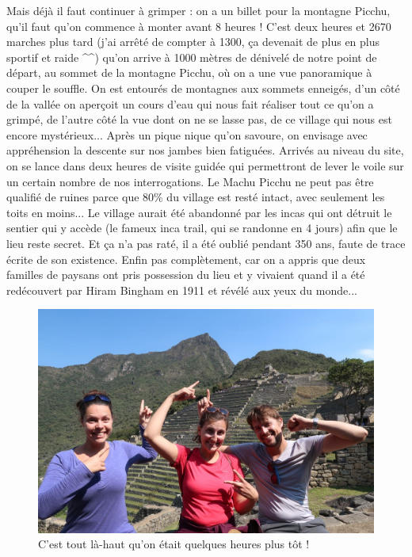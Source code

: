 Mais déjà il faut continuer à grimper : on a un billet pour la montagne
Picchu, qu'il faut qu'on commence à monter avant 8 heures ! C'est deux
heures et 2670 marches plus tard (j'ai arrêté de compter à 1300, ça
devenait de plus en plus sportif et raide \^{}\^{}) qu'on arrive à 1000
mètres de dénivelé de notre point de départ, au sommet de la montagne
Picchu, où on a une vue panoramique à couper le souffle. On est entourés
de montagnes aux sommets enneigés, d'un côté de la vallée on aperçoit un
cours d'eau qui nous fait réaliser tout ce qu'on a grimpé, de l'autre
côté la vue dont on ne se lasse pas, de ce village qui nous est encore
mystérieux... Après un pique nique qu'on savoure, on envisage avec
appréhension la descente sur nos jambes bien fatiguées. Arrivés au
niveau du site, on se lance dans deux heures de visite guidée qui
permettront de lever le voile sur un certain nombre de nos
interrogations. Le Machu Picchu ne peut pas être qualifié de ruines
parce que 80\% du village est resté intact, avec seulement les toits en
moins... Le village aurait été abandonné par les incas qui ont détruit
le sentier qui y accède (le fameux inca trail, qui se randonne en 4
jours) afin que le lieu reste secret. Et ça n'a pas raté, il a été
oublié pendant 350 ans, faute de trace écrite de son existence. Enfin
pas complètement, car on a appris que deux familles de paysans ont pris
possession du lieu et y vivaient quand il a été redécouvert par Hiram
Bingham en 1911 et révélé aux yeux du monde...

\begin{figure}
\centering
\includegraphics{images/20180911_montana.JPG}
\caption{C'est tout là-haut qu'on était quelques heures plus tôt !}
\end{figure}

